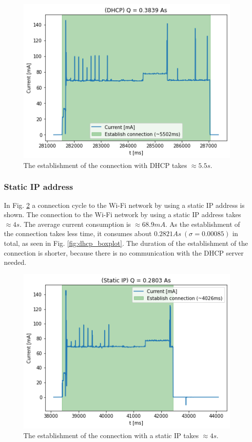 \begin{figure}[H]
    \centering
    \includegraphics[width =\linewidth]{fig/dhcp.png}
    \caption{The establishment of the connection with DHCP takes $\approx 5.5s$.}
    \label{fig:dhcp}
\end{figure}

\subsubsection{Static IP address}
In Fig. \ref{fig:static_ip} a connection cycle to the Wi-Fi network by using a static IP address is shown.
The connection to the Wi-Fi network by using a static IP address takes $\approx 4 s$.
The average current consumption is $\approx 68.9 mA$.
As the establishment of the connection takes less time, it consumes about $0.2821 As\ (\sigma = 0.00085)$  in total, as seen in Fig. \ref{fig:dhcp_boxplot}.
The duration of the establishment of the connection is shorter, because there is no communication with the DHCP server needed.

\begin{figure}[H]
    \centering
    \includegraphics[width =\linewidth]{fig/static_ip.png}
    \caption{The establishment of the connection with a static IP takes $\approx 4s$.}
    \label{fig:static_ip}
\end{figure}


